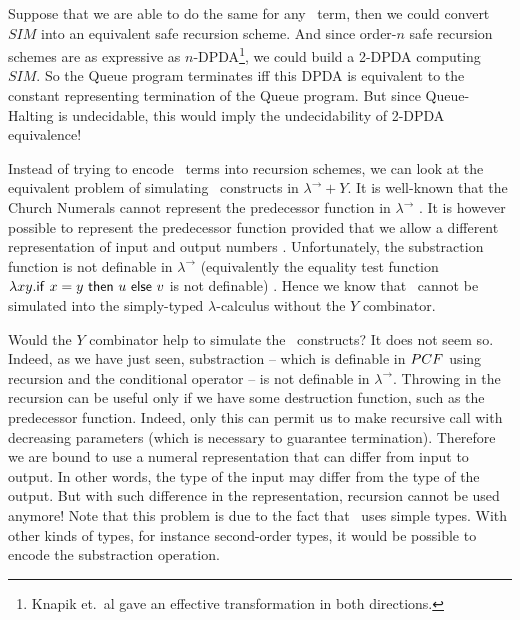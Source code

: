 \documentclass{article}
\begin{document}
Suppose that we are able to do the same for any \pcf\ term, then we
could convert $SIM$ into an equivalent safe recursion scheme. And
since order-$n$ safe recursion schemes are as expressive as
$n$-DPDA\footnote{Knapik et.~al \cite{KNU02} gave an effective
transformation in both directions.}, we could build a
2-DPDA computing $SIM$. So the Queue program terminates iff
this DPDA is equivalent to the constant representing termination of the Queue program. But since Queue-Halting is undecidable, this would
imply the undecidability of 2-DPDA equivalence!



Instead of trying to encode  \pcf\ terms into recursion schemes, we
can look at the equivalent problem of simulating \pcf\ constructs in
$\lambda^\rightarrow + Y$. It is well-known that the Church Numerals
cannot represent the predecessor function in $\lambda^\rightarrow$ \cite{DBLP:journals/jacm/FortuneLO83}. It
is however possible to represent the predecessor function provided
that we allow a different representation of input and output numbers
\cite{DBLP:journals/jacm/FortuneLO83}. Unfortunately, the
substraction function is not definable in $\lambda^\rightarrow$
(equivalently  the equality test function $\lambda xy. {\sf if\ } x
= y {\sf\ then\ } u {\sf\ else\ } v$ is not definable)
\cite{DBLP:journals/jacm/FortuneLO83}. Hence we know that \pcf\
cannot be simulated into the simply-typed $\lambda$-calculus without
the $Y$ combinator.

Would the $Y$ combinator help to simulate the \pcf\ constructs? It
does not seem so. Indeed, as we have just seen, substraction --
which is definable in ${PCF}$ using recursion and the conditional
operator -- is not definable in $\lambda^\rightarrow$. Throwing in
the recursion can be useful only if we have some destruction
function, such as the predecessor function. Indeed, only this can
permit us to make recursive call with decreasing parameters (which
is necessary to guarantee termination). Therefore we are bound to
use a numeral representation that can differ from input to output.
In other words, the type of the input may differ from the type of
the output. But with such difference in the representation,
recursion cannot be used anymore! Note that this problem is due to
the fact that \pcf\ uses simple types. With other kinds of types,
for instance second-order types, it would be possible to encode the
substraction operation.
\end{document}
